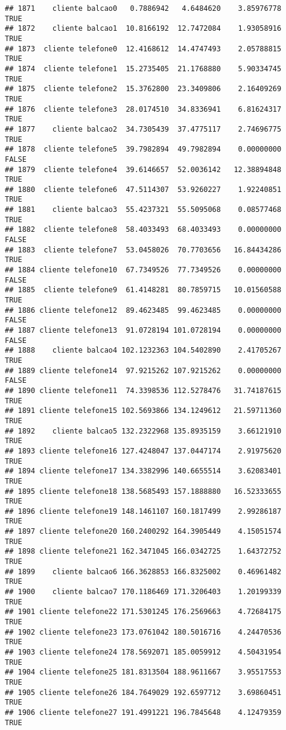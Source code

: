 \documentclass[
]{article}
\begin{document}
\begin{verbatim}
## 1871    cliente balcao0   0.7886942   4.6484620    3.85976778     TRUE
## 1872    cliente balcao1  10.8166192  12.7472084    1.93058916     TRUE
## 1873  cliente telefone0  12.4168612  14.4747493    2.05788815     TRUE
## 1874  cliente telefone1  15.2735405  21.1768880    5.90334745     TRUE
## 1875  cliente telefone2  15.3762800  23.3409806    2.16409269     TRUE
## 1876  cliente telefone3  28.0174510  34.8336941    6.81624317     TRUE
## 1877    cliente balcao2  34.7305439  37.4775117    2.74696775     TRUE
## 1878  cliente telefone5  39.7982894  49.7982894    0.00000000    FALSE
## 1879  cliente telefone4  39.6146657  52.0036142   12.38894848     TRUE
## 1880  cliente telefone6  47.5114307  53.9260227    1.92240851     TRUE
## 1881    cliente balcao3  55.4237321  55.5095068    0.08577468     TRUE
## 1882  cliente telefone8  58.4033493  68.4033493    0.00000000    FALSE
## 1883  cliente telefone7  53.0458026  70.7703656   16.84434286     TRUE
## 1884 cliente telefone10  67.7349526  77.7349526    0.00000000    FALSE
## 1885  cliente telefone9  61.4148281  80.7859715   10.01560588     TRUE
## 1886 cliente telefone12  89.4623485  99.4623485    0.00000000    FALSE
## 1887 cliente telefone13  91.0728194 101.0728194    0.00000000    FALSE
## 1888    cliente balcao4 102.1232363 104.5402890    2.41705267     TRUE
## 1889 cliente telefone14  97.9215262 107.9215262    0.00000000    FALSE
## 1890 cliente telefone11  74.3398536 112.5278476   31.74187615     TRUE
## 1891 cliente telefone15 102.5693866 134.1249612   21.59711360     TRUE
## 1892    cliente balcao5 132.2322968 135.8935159    3.66121910     TRUE
## 1893 cliente telefone16 127.4248047 137.0447174    2.91975620     TRUE
## 1894 cliente telefone17 134.3382996 140.6655514    3.62083401     TRUE
## 1895 cliente telefone18 138.5685493 157.1888880   16.52333655     TRUE
## 1896 cliente telefone19 148.1461107 160.1817499    2.99286187     TRUE
## 1897 cliente telefone20 160.2400292 164.3905449    4.15051574     TRUE
## 1898 cliente telefone21 162.3471045 166.0342725    1.64372752     TRUE
## 1899    cliente balcao6 166.3628853 166.8325002    0.46961482     TRUE
## 1900    cliente balcao7 170.1186469 171.3206403    1.20199339     TRUE
## 1901 cliente telefone22 171.5301245 176.2569663    4.72684175     TRUE
## 1902 cliente telefone23 173.0761042 180.5016716    4.24470536     TRUE
## 1903 cliente telefone24 178.5692071 185.0059912    4.50431954     TRUE
## 1904 cliente telefone25 181.8313504 188.9611667    3.95517553     TRUE
## 1905 cliente telefone26 184.7649029 192.6597712    3.69860451     TRUE
## 1906 cliente telefone27 191.4991221 196.7845648    4.12479359     TRUE

\end{verbatim}
\end{document}
